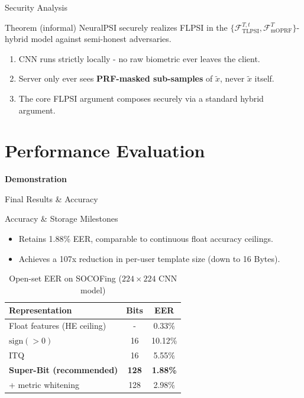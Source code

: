 \documentclass{beamer}
\begin{document}
\begin{frame}{Security Analysis}
  \begin{block}{\small Theorem (informal)}
  \small NeuralPSI securely realizes FLPSI in the
  $\{\mathcal{F}^{T,t}_{\text{TLPSI}}, \mathcal{F}^T_{\text{mOPRF}}\}$-hybrid
  model against semi-honest adversaries.
  \end{block}
  
  \vspace{8pt}
  \small
  \begin{enumerate}
    \item CNN runs strictly locally - no raw biometric ever leaves the client.
    \item Server only ever sees \textbf{PRF-masked sub-samples} of $\tilde x$,
    never $\tilde x$ itself.
    \item The core FLPSI argument composes securely via a standard
    hybrid argument.
  \end{enumerate}
\end{frame}



\section{Performance Evaluation}

\begin{frame}
  \centering
  \vspace{2.4cm}
  {\Huge \textbf{\alert{Demonstration}}}
\end{frame}

\begin{frame}{Final Results \& Accuracy}
  \begin{block}{Accuracy \& Storage Milestones}
    \begin{itemize}
      \item Retains 1.88\% EER, comparable to continuous float accuracy ceilings.
      \item Achieves a 107x reduction in per-user template size (down to 16 Bytes).
    \end{itemize}
  \end{block}

  \begin{table}
    \centering
    \caption{Open-set EER on SOCOFing ($224\times224$ CNN model)}
    \begin{tabular}{lcc}
      \toprule
      \textbf{Representation} & \textbf{Bits} & \textbf{EER} \\ 
      \midrule
      Float features (HE ceiling) & - & 0.33\% \\
      $\text{sign}(>0)$ & 16 & 10.12\% \\
      ITQ & 16 & 5.55\% \\
      \textbf{Super-Bit (recommended)} & \textbf{128} & \textbf{1.88\%} \\
      + metric whitening & 128 & 2.98\% \\ 
      \bottomrule
    \end{tabular}
  \end{table}
\end{frame}
\end{document}

